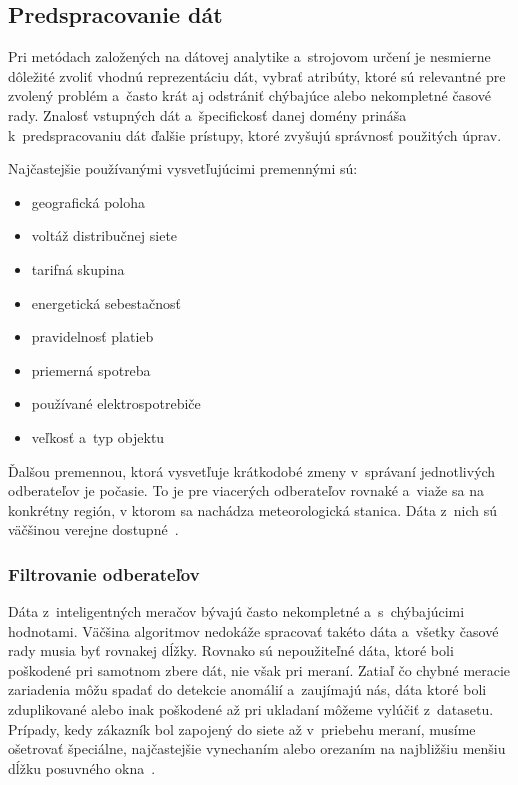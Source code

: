 \documentclass[a4paper,twoside,slovak,12pt,appendix]{article}
\begin{document}

\subsection{Predspracovanie dát}
Pri metódach založených na dátovej analytike a~strojovom určení je nesmierne
dôležité zvoliť vhodnú reprezentáciu dát, vybrať atribúty, ktoré sú relevantné
pre zvolený problém a~často krát aj odstrániť chýbajúce alebo nekompletné časové
rady. Znalosť vstupných dát a~špecifickosť danej domény prináša
k~predspracovaniu dát ďalšie prístupy, ktoré zvyšujú správnosť použitých úprav.

Najčastejšie používanými vysvetľujúcimi premennými sú:
\begin{itemize}
  \item geografická poloha
  \item voltáž distribučnej siete
  \item tarifná skupina
  \item energetická sebestačnosť
  \item pravidelnosť platieb
  \item priemerná spotreba
  \item používané elektrospotrebiče
  \item veľkosť a~typ objektu
\end{itemize}
Ďalšou premennou, ktorá vysvetľuje krátkodobé zmeny v~správaní jednotlivých
odberateľov je počasie. To je pre viacerých odberateľov rovnaké a~viaže sa na
konkrétny región, v ktorom sa nachádza meteorologická stanica. Dáta z~nich sú
väčšinou verejne dostupné~\cite{Stankovic2014}.

\subsubsection{Filtrovanie odberateľov}
Dáta z~inteligentných meračov bývajú často nekompletné a~s~chýbajúcimi
hodnotami. Väčšina algoritmov nedokáže spracovať takéto dáta a~všetky časové
rady musia byť rovnakej dĺžky. Rovnako sú nepoužiteľné dáta, ktoré boli
poškodené pri samotnom zbere dát, nie však pri meraní. Zatiaľ čo chybné meracie
zariadenia môžu spadať do detekcie anomálií a~zaujímajú nás, dáta ktoré boli
zduplikované alebo inak poškodené až pri ukladaní môžeme vylúčiť z~datasetu.
Prípady, kedy zákazník bol zapojený do siete až v~priebehu meraní, musíme
ošetrovať špeciálne, najčastejšie vynechaním alebo orezaním na najbližšiu menšiu
dĺžku posuvného okna~\cite{Nagi2008}.
\end{document}
